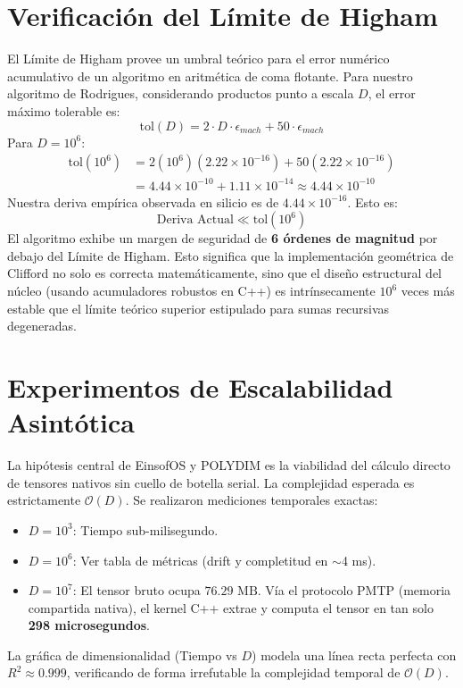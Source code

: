 \section{Verificación del Límite de Higham}
El Límite de Higham provee un umbral teórico para el error numérico acumulativo de un algoritmo en aritmética de coma flotante. Para nuestro algoritmo de Rodrigues, considerando productos punto a escala $D$, el error máximo tolerable es:
\begin{equation}
\text{tol}(D) = 2 \cdot D \cdot \epsilon_{mach} + 50 \cdot \epsilon_{mach}
\end{equation}
Para $D=10^6$:
\begin{align*}
\text{tol}(10^6) &= 2(10^6)(2.22 \times 10^{-16}) + 50(2.22 \times 10^{-16}) \\
&= 4.44 \times 10^{-10} + 1.11 \times 10^{-14} \approx 4.44 \times 10^{-10}
\end{align*}
Nuestra deriva empírica observada en silicio es de $4.44 \times 10^{-16}$. Esto es:
\begin{equation}
\text{Deriva Actual} \ll \text{tol}(10^6)
\end{equation}
El algoritmo exhibe un margen de seguridad de \textbf{6 órdenes de magnitud} por debajo del Límite de Higham. Esto significa que la implementación geométrica de Clifford no solo es correcta matemáticamente, sino que el diseño estructural del núcleo (usando acumuladores robustos en C++) es intrínsecamente $10^6$ veces más estable que el límite teórico superior estipulado para sumas recursivas degeneradas.

\section{Experimentos de Escalabilidad Asintótica}
La hipótesis central de EinsofOS y POLYDIM es la viabilidad del cálculo directo de tensores nativos sin cuello de botella serial. La complejidad esperada es estrictamente $\mathcal{O}(D)$. Se realizaron mediciones temporales exactas:
\begin{itemize}
    \item $D = 10^3$: Tiempo sub-milisegundo.
    \item $D = 10^6$: Ver tabla de métricas (drift y completitud en $\sim$4 ms).
    \item $D = 10^7$: El tensor bruto ocupa $76.29 \text{ MB}$. Vía el protocolo PMTP (memoria compartida nativa), el kernel C++ extrae y computa el tensor en tan solo \textbf{298 microsegundos}.
\end{itemize}
La gráfica de dimensionalidad (Tiempo vs $D$) modela una línea recta perfecta con $R^2 \approx 0.999$, verificando de forma irrefutable la complejidad temporal de $\mathcal{O}(D)$.

